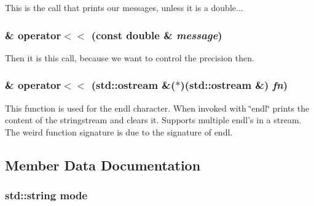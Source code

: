 This is the call that prints our messages, unless it is a double... \hypertarget{classJKBuilder_1_1IOManager_a127779d1803b6ffe9e44a3a36e46910e}{
\subsubsection[{operator$<$$<$}]{ \& operator$<$$<$ (const double \& {\em message})}}
\label{classJKBuilder_1_1IOManager_a127779d1803b6ffe9e44a3a36e46910e}


Then it is this call, because we want to control the precision then. \hypertarget{classJKBuilder_1_1IOManager_a4ab394f377d37c6598659317320ec38c}{
\subsubsection[{operator$<$$<$}]{ \& operator$<$$<$ (std::ostream \&($\ast$)(std::ostream \&) {\em fn})}}
\label{classJKBuilder_1_1IOManager_a4ab394f377d37c6598659317320ec38c}


This function is used for the endl character. When invoked with \char`\"{}endl\char`\"{} prints the content of the stringstream and clears it. Supports multiple endl's in a stream. The weird function signature is due to the signature of endl. 

\subsection{Member Data Documentation}
\hypertarget{classJKBuilder_1_1FileManager_a6c71000b535e65812d96eee3386307c4}{
\subsubsection[{mode}]{\setlength{\rightskip}{0pt plus 5cm}std::string {\bf mode}}}
\label{classJKBuilder_1_1FileManager_a6c71000b535e65812d96eee3386307c4}


